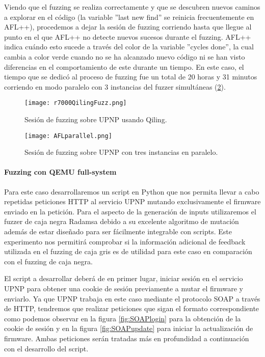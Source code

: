 Viendo que el fuzzing se realiza correctamente y que se descubren nuevos caminos a explorar en el código (la variable ''last new find'' se reinicia frecuentemente en AFL++), procedemos a dejar la 
sesión de fuzzing corriendo hasta que llegue al punto en el que AFL++ no detecte nuevos sucesos durante el fuzzing. AFL++ indica cuándo
esto sucede a través del color de la variable ''cycles done'', la cual cambia a color verde cuando no se ha alcanzado nuevo código 
ni se han visto diferencias en el comportamiento de este durante un tiempo. En este caso, el tiempo que se dedicó al proceso de fuzzing 
fue un total de 20 horas y 31 minutos corriendo en modo paralelo con 3 instancias del fuzzer simultáneas (\ref{fig:R7000parallel}).

\begin{figure}[H]
    \centering
    \texttt{[image: r7000QilingFuzz.png]}
    \caption{Sesión de fuzzing sobre UPNP usando Qiling.}
    \label{fig:R7000QilingFuzz}
\end{figure}

\begin{figure}[H]
    \centering
    \texttt{[image: AFLparallel.png]}
    \caption{Sesión de fuzzing sobre UPNP con tres instancias en paralelo.}
    \label{fig:R7000parallel}
\end{figure}

\paragraph{Fuzzing con QEMU full-system}
Para este caso desarrollaremos un script en Python que nos permita llevar a cabo repetidas peticiones HTTP
al servicio UPNP mutando exclusivamente el firmware enviado en la petición. Para el aspecto de la generación de
inputs utilizaremos el fuzzer de caja negra Radamsa\cite{radamsa} debido a su excelente algoritmo 
de mutación además de estar diseñado para ser fácilmente integrable con scripts. Este experimento nos 
permitirá comprobar si la información adicional de feedback utilizada en el fuzzing de caja gris es 
de utilidad para este caso en comparación con el fuzzing de caja negra.\bigskip

El script a desarrollar deberá de en primer lugar, iniciar sesión en el servicio UPNP para obtener una cookie de sesión
previamente a mutar el firmware y enviarlo. Ya que UPNP trabaja en este caso mediante el protocolo SOAP a través de HTTP,
tendremos que realizar peticiones que sigan el formato correspondiente como podemos observar en la figura \ref{fig:SOAPlogin}
para la obtención de la cookie de sesión y en la figura \ref{fig:SOAPupdate} para iniciar la actualización de firmware.
Ambas peticiones serán tratadas más en profundidad a continuación con el desarrollo del script.

